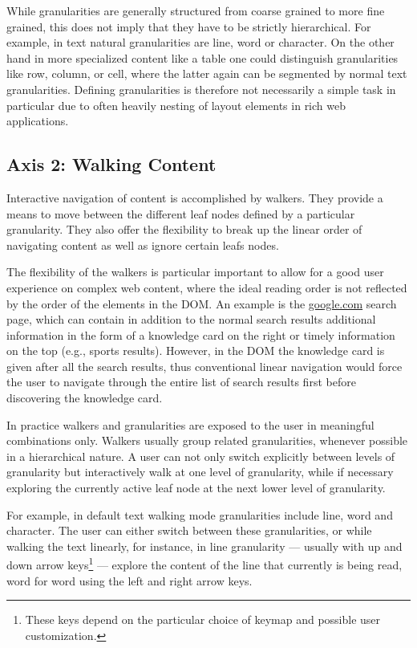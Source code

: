 \documentclass{sig-alternate}
\begin{document}
While granularities are generally structured from coarse grained to more fine
grained, this does not imply that they have to be strictly hierarchical. For
example, in text natural granularities are line, word or character. On the other
hand in more specialized content like a table one could distinguish
granularities like row, column, or cell, where the latter again can be segmented
by normal text granularities.  Defining granularities is therefore not
necessarily a simple task in particular due to often heavily nesting of layout
elements in rich web applications.

\subsection{Axis 2: Walking Content}
\label{sec:ax2}

Interactive navigation of content is accomplished by walkers.  They provide a
means to move between the different leaf nodes defined by a particular
granularity. They also offer the flexibility to break up the linear order of
navigating content as well as ignore certain leafs nodes.

The flexibility of the walkers is particular important to allow for a good user
experience on complex web content, where the ideal reading order is not
reflected by the order of the elements in the DOM. An example is the
\url{google.com} search page, which can contain in addition to the normal search
results additional information in the form of a knowledge card on the right or
timely information on the top (e.g., sports results). However, in the DOM the
knowledge card is given after all the search results, thus conventional linear
navigation would force the user to navigate through the entire list of search
results first before discovering the knowledge card.

In practice walkers and granularities are exposed to the user in meaningful
combinations only. Walkers usually group related granularities, whenever
possible in a hierarchical nature.  A user can not only switch explicitly
between levels of granularity but interactively walk at one level of
granularity, while if necessary exploring the currently active leaf node at the
next lower level of granularity.

For example, in default text walking mode granularities include line, word and
character. The user can either switch between these granularities, or while
walking the text linearly, for instance, in line granularity --- usually with up
and down arrow keys\footnote{These keys depend on the particular choice of
  keymap and possible user customization.}  --- explore the content of the line
that currently is being read, word for word using the left and right arrow keys.
\end{document}
